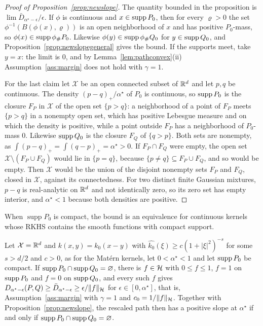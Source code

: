 \begin{proof}[Proof of Proposition~\ref{prop:newslope}]
The quantity bounded in the proposition is $\lim \bar D_{\alpha^\star-\epsilon}/\epsilon$. If $\phi$ is continuous and
$x\in\operatorname{supp} P_0$, then for every $\varrho>0$ the set $\phi^{-1}(B(\phi(x),\varrho))$ is an open neighborhood of $x$ and has
positive $P_0$-mass, so $\phi(x)\in\operatorname{supp}\phi_\#P_0$. Likewise $\phi(y)\in\operatorname{supp}\phi_\#Q_0$ for $y\in\operatorname{supp} Q_0$, and
Proposition~\ref{prop:newslopegeneral} gives the bound. If the supports meet, take $y=x$: the limit is $0$, and by
Lemma~\ref{lem:pathconvex}(ii) Assumption~\ref{ass:margin} does not hold with $\gamma=1$.

For the last claim let $\mathcal X$ be an open connected subset of $\mathbb{R}^d$ and let $p,q$ be continuous. The density
$(p-q)_+/\alpha^\star$ of $P_0$ is continuous, so $\operatorname{supp} P_0$ is the closure $F_P$ in $\mathcal X$ of the open set
$\{p>q\}$: a neighborhood of a point of $F_P$ meets $\{p>q\}$ in a nonempty open set, which has positive Lebesgue
measure and on which the density is positive, while a point outside $F_P$ has a neighborhood of $P_0$-mass $0$.
Likewise $\operatorname{supp} Q_0$ is the closure $F_Q$ of $\{q>p\}$. Both sets are nonempty, as $\int(p-q)_+=\int(q-p)_+=\alpha^\star>0$.
If $F_P\cap F_Q$ were empty, the open set $\mathcal X\setminus(F_P\cup F_Q)$ would lie in $\{p=q\}$, because
$\{p\neq q\}\subseteq F_P\cup F_Q$, and so would be empty. Then $\mathcal X$ would be the union of the disjoint nonempty
sets $F_P$ and $F_Q$, closed in $\mathcal X$, against its connectedness. For two distinct finite Gaussian mixtures,
$p-q$ is real-analytic on $\mathbb{R}^d$ and not identically zero, so its zero set has empty interior, and $\alpha^\star<1$
because both densities are positive.
\end{proof}

When $\operatorname{supp}P_0$ is compact, the bound is an equivalence for continuous kernels whose RKHS contains the
smooth functions with compact support.

\begin{proposition}
\label{prop:newgammaone}
Let $\mathcal X=\mathbb{R}^d$ and $k(x,y)=k_0(x-y)$ with $\widehat{k_0}(\xi)\ge c(1+|\xi|^2)^{-s}$ for some $s>d/2$ and $c>0$,
as for the Mat\'ern kernels, let $0<\alpha^\star<1$ and let $\operatorname{supp} P_0$ be compact. If $\operatorname{supp} P_0\cap\operatorname{supp} Q_0=\varnothing$,
there is $f\in\mathcal{H}$ with $0\le f\le1$, $f=1$ on $\operatorname{supp} P_0$ and $f=0$ on $\operatorname{supp} Q_0$, and every such $f$ gives
$D_{\alpha^\star-\epsilon}(P,Q)\ge \bar D_{\alpha^\star-\epsilon}\ge\epsilon/\|f\|_{\mathcal{H}}$ for $\epsilon\in[0,\alpha^\star]$, that is,
Assumption~\ref{ass:margin} with $\gamma=1$ and $c_0=1/\|f\|_{\mathcal{H}}$. Together with Proposition~\ref{prop:newslope}, the
rescaled path then has a positive slope at $\alpha^\star$ if and only if $\operatorname{supp} P_0\cap\operatorname{supp} Q_0=\varnothing$.
\end{proposition}

